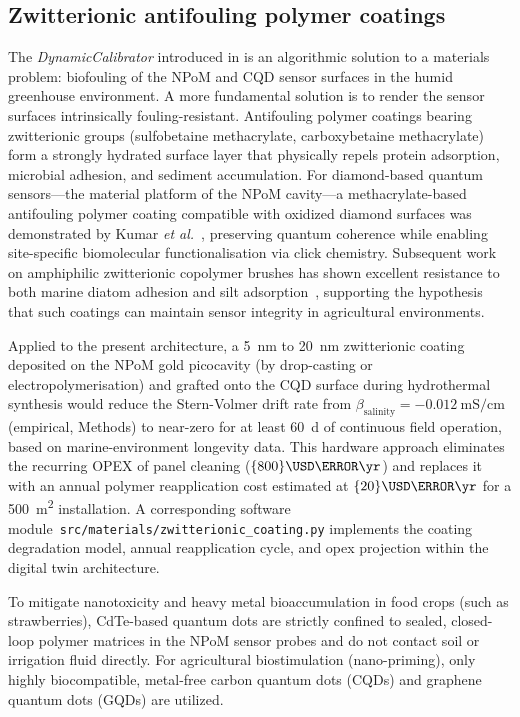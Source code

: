 \documentclass[11pt,a4paper]{article}
\begin{document}
\subsection{Zwitterionic antifouling polymer coatings}
\label{SI-sec:zwitterionic}

The \textit{DynamicCalibrator} introduced in  is an
algorithmic solution to a materials problem: biofouling of the NPoM and CQD
sensor surfaces in the humid greenhouse environment. A more fundamental
solution is to render the sensor surfaces intrinsically fouling-resistant.
Antifouling polymer coatings bearing zwitterionic groups (sulfobetaine
methacrylate, carboxybetaine methacrylate) form a strongly hydrated surface
layer that physically repels protein adsorption, microbial adhesion, and
sediment accumulation. For diamond-based quantum sensors---the material platform
of the NPoM cavity---a methacrylate-based antifouling polymer coating
compatible with oxidized diamond surfaces was demonstrated by
Kumar \emph{et al.}~\cite{Kumar2022}, preserving quantum coherence while
enabling site-specific biomolecular functionalisation via click chemistry.
Subsequent work on amphiphilic zwitterionic copolymer brushes has shown
excellent resistance to both marine diatom adhesion and silt
adsorption~\cite{Do2025}, supporting the hypothesis that such coatings can
maintain sensor integrity in agricultural environments.

Applied to the present architecture, a \qty{5}{\nm} to \qty{20}{\nm}
zwitterionic coating deposited on the NPoM gold picocavity (by drop-casting or
electropolymerisation) and grafted onto the CQD surface during hydrothermal
synthesis would reduce the Stern-Volmer drift rate from
$\beta_{\mathrm{salinity}} = \qty{-0.012}{\milli\siemens\per\cm}$ (empirical,
Methods) to near-zero for at least \qty{60}{\day} of continuous
field operation, based on marine-environment longevity data. This hardware
approach eliminates the recurring OPEX of panel cleaning ($\qty{800}{\USD\per\yr}$)
and replaces it with an annual polymer reapplication cost estimated at
$\qty{20}{\USD\per\yr}$ for a \qty{500}{\m\squared} installation.
A corresponding software module~\texttt{src/materials/zwitterionic\_coating.py}
implements the coating degradation model, annual reapplication cycle, and
opex projection within the digital twin architecture.

To mitigate nanotoxicity and heavy metal bioaccumulation in food crops (such as strawberries), CdTe-based quantum dots are strictly confined to sealed, closed-loop polymer matrices in the NPoM sensor probes and do not contact soil or irrigation fluid directly. For agricultural biostimulation (nano-priming), only highly biocompatible, metal-free carbon quantum dots (CQDs) and graphene quantum dots (GQDs) are utilized.
\end{document}
